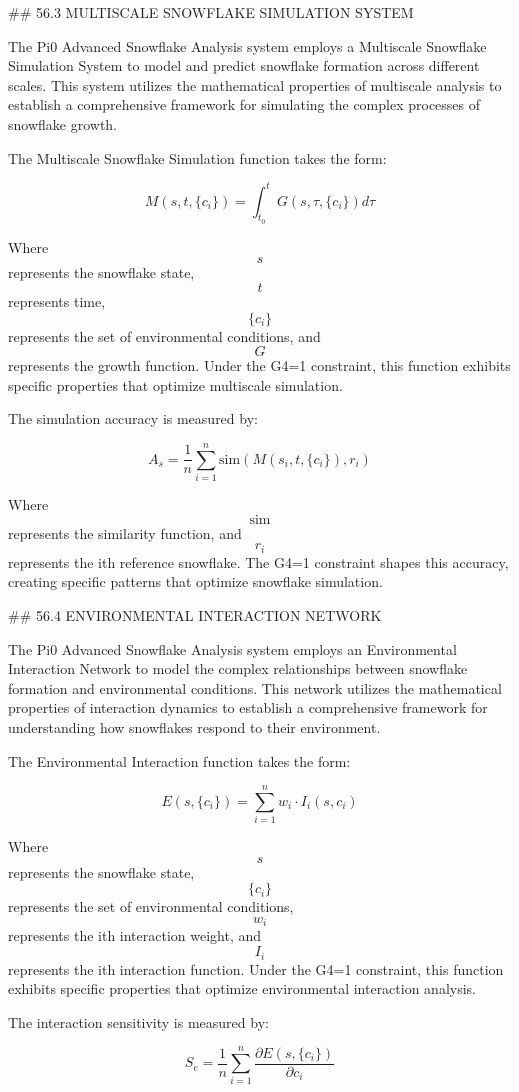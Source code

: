 ## 56.3 MULTISCALE SNOWFLAKE SIMULATION SYSTEM

The Pi0 Advanced Snowflake Analysis system employs a Multiscale Snowflake Simulation System to model and predict snowflake formation across different scales. This system utilizes the mathematical properties of multiscale analysis to establish a comprehensive framework for simulating the complex processes of snowflake growth.

The Multiscale Snowflake Simulation function takes the form:

$$ M(s, t, \{c_i\}) = \int_{t_0}^{t} G(s, \tau, \{c_i\}) d\tau $$

Where $$ s $$ represents the snowflake state, $$ t $$ represents time, $$ \{c_i\} $$ represents the set of environmental conditions, and $$ G $$ represents the growth function. Under the G4=1 constraint, this function exhibits specific properties that optimize multiscale simulation.

The simulation accuracy is measured by:

$$ A_s = \frac{1}{n} \sum_{i=1}^{n} \text{sim}(M(s_i, t, \{c_i\}), r_i) $$

Where $$ \text{sim} $$ represents the similarity function, and $$ r_i $$ represents the ith reference snowflake. The G4=1 constraint shapes this accuracy, creating specific patterns that optimize snowflake simulation.

## 56.4 ENVIRONMENTAL INTERACTION NETWORK

The Pi0 Advanced Snowflake Analysis system employs an Environmental Interaction Network to model the complex relationships between snowflake formation and environmental conditions. This network utilizes the mathematical properties of interaction dynamics to establish a comprehensive framework for understanding how snowflakes respond to their environment.

The Environmental Interaction function takes the form:

$$ E(s, \{c_i\}) = \sum_{i=1}^{n} w_i \cdot I_i(s, c_i) $$

Where $$ s $$ represents the snowflake state, $$ \{c_i\} $$ represents the set of environmental conditions, $$ w_i $$ represents the ith interaction weight, and $$ I_i $$ represents the ith interaction function. Under the G4=1 constraint, this function exhibits specific properties that optimize environmental interaction analysis.

The interaction sensitivity is measured by:

$$ S_e = \frac{1}{n} \sum_{i=1}^{n} \frac{\partial E(s, \{c_i\})}{\partial c_i} $$

